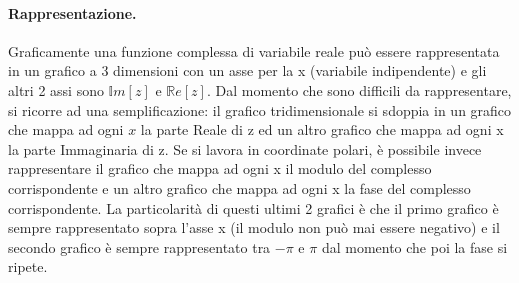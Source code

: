 \paragraph{Rappresentazione.}Graficamente una funzione complessa di variabile reale può essere rappresentata in un grafico a 3 dimensioni con un asse per la x (variabile indipendente) e gli altri 2 assi sono $\mathbb{I}m[z]$ e $\mathbb{R}e[z]$.
Dal momento che sono difficili da rappresentare, si ricorre ad una semplificazione: il grafico tridimensionale si sdoppia in un grafico che mappa ad ogni $x$ la parte Reale di z ed un altro grafico che mappa ad ogni x la parte Immaginaria di z.
Se si lavora in coordinate polari, è possibile invece rappresentare il grafico che mappa ad ogni x il modulo del complesso corrispondente e un altro grafico che mappa ad ogni x la fase del complesso corrispondente. La particolarità di questi ultimi 2 grafici è che il primo grafico è sempre rappresentato sopra l'asse x (il modulo non può mai essere negativo) e il secondo grafico è sempre rappresentato tra $-\pi$ e $\pi$ dal momento che poi la fase si ripete.